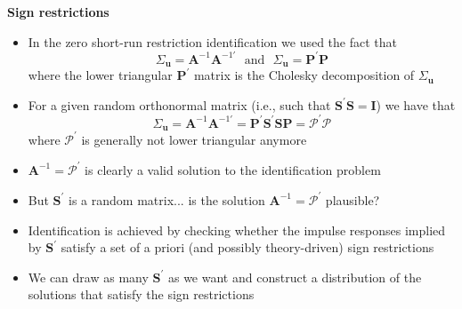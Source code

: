 \documentclass[10pt,handout]{beamer}
\begin{document}
\begin{frame}
{\textbf{Sign restrictions}}

\begin{itemize}
\item In the zero short-run restriction identification we used the fact that%
\begin{equation*}
\Sigma _{\mathbf{u}}=\mathbf{A}^{-1}\mathbf{A}^{-1\prime }\ \ \ \text{and}\
\ \ \Sigma _{\mathbf{u}}=\mathbf{P}^{\prime }\mathbf{P}
\end{equation*}%
where the lower triangular $\mathbf{P}^{\prime }$ matrix is the Cholesky
decomposition of $\Sigma _{\mathbf{u}}$\smallskip \pause

\item For a given random {%
{\color{red} orthonormal matrix}%
} (i.e., such that $\mathbf{S}^{\prime }\mathbf{S}=\mathbf{I}$) we have that%
\begin{equation*}
\Sigma _{\mathbf{u}}=\mathbf{A}^{-1}\mathbf{A}^{-1\prime }=\mathbf{P}%
^{\prime }\mathbf{S}^{\prime }\mathbf{SP=}\mathcal{P}^{\prime }\mathcal{P}
\end{equation*}%
where $\mathcal{P}^{\prime }$ is generally not lower triangular anymore
\end{itemize}
\end{frame}

\vspace{.1cm}

\begin{frame}
\begin{itemize}
\item $\mathbf{A}^{-1}=\mathcal{P}^{\prime }$ is clearly a valid solution to
the identification problem\medskip \pause

\item But $\mathbf{S}^{\prime }$ is a random matrix... is the solution $%
\mathbf{A}^{-1}=\mathcal{P}^{\prime }$ plausible?\medskip \pause

\item Identification is achieved by checking whether the impulse responses
implied by $\mathbf{S}^{\prime }$ satisfy a set of a priori (and possibly
theory-driven) sign restrictions\medskip \pause

\item We can draw as many $\mathbf{S}^{\prime }$ as we want and construct a
distribution of the solutions that satisfy the sign restrictions
\end{itemize}
\end{frame}
\end{document}
